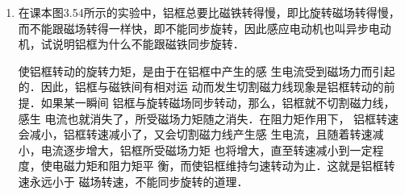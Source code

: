 \begin{enumerate}
    \item 在课本图3.54所示的实验中，铝框总要比磁铁转得慢，即比旋转磁场转得慢，而不能跟磁场转得一样快，即不能同步旋转，因此感应电动机也叫异步电动机，试说明铝框为什么不能跟磁铁同步旋转．

    \begin{solution}
使铝框转动的旋转力矩，是由于在铝框中产生的感
生电流受到磁场力而引起的．因此，铝框与磁铁间有相对运
动而发生切割磁力线现象是铝框转动的前提．如果某一瞬间
铝框与旋转磁场同步转动，那么，铝框就不切割磁力线，感生
电流也就消失了，所受磁场力矩随之消失．在阻力矩作用下，
铝框转速会减小，铝框转速减小了，又会切割磁力线产生感
生电流，且随着转速减小，电流逐步增大，铝框所受磁场力矩
也将增大，直至转速减小到一定程度，使电磁力矩和阻力矩平
衡，而使铝框维持匀速转动为止．这就是铝框转速永远小于
磁场转速，不能同步旋转的道理． 
    \end{solution}
    
\end{enumerate}




